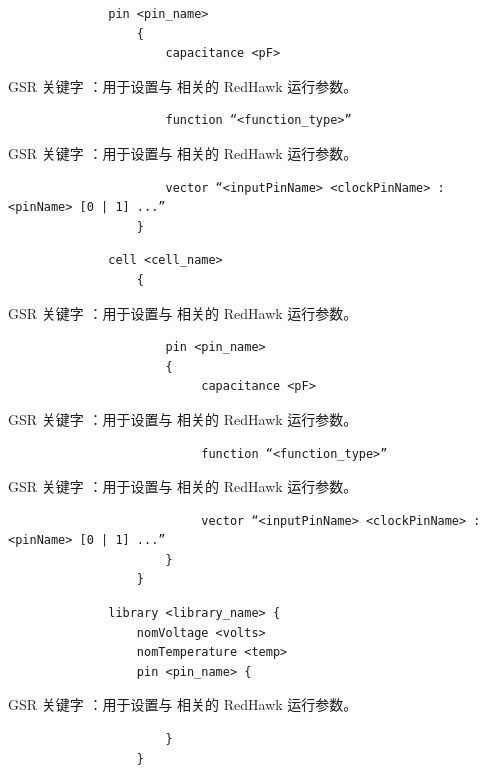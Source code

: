 \begin{lstlisting}
              pin <pin_name>
                  {
                      capacitance <pF>
\end{lstlisting}

GSR 关键字 ：用于设置与  相关的 RedHawk 运行参数。

\begin{lstlisting}
                      function “<function_type>”
\end{lstlisting}

GSR 关键字 ：用于设置与  相关的 RedHawk 运行参数。

\begin{lstlisting}
                      vector “<inputPinName> <clockPinName> : <pinName> [0 | 1] ...”
                  }
\end{lstlisting}

\begin{lstlisting}
              cell <cell_name>
                  {
\end{lstlisting}

GSR 关键字 ：用于设置与  相关的 RedHawk 运行参数。

\begin{lstlisting}
                      pin <pin_name>
                      {
                           capacitance <pF>
\end{lstlisting}

GSR 关键字 ：用于设置与  相关的 RedHawk 运行参数。

\begin{lstlisting}
                           function “<function_type>”
\end{lstlisting}

GSR 关键字 ：用于设置与  相关的 RedHawk 运行参数。

\begin{lstlisting}
                           vector “<inputPinName> <clockPinName> : <pinName> [0 | 1] ...”
                      }
                  }
\end{lstlisting}

\begin{lstlisting}
              library <library_name> {
                  nomVoltage <volts>
                  nomTemperature <temp>
                  pin <pin_name> {
\end{lstlisting}

GSR 关键字 ：用于设置与  相关的 RedHawk 运行参数。

\begin{lstlisting}
                      }
                  }
\end{lstlisting}

